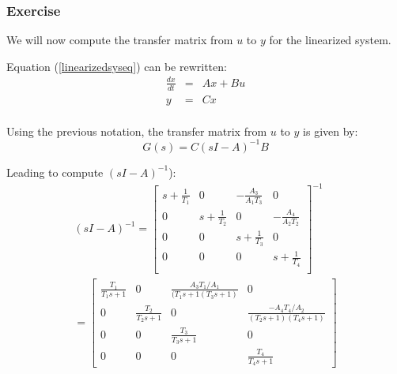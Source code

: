 \subsubsection{Exercise}

We will now compute the transfer matrix from $u$ to $y$ for the linearized system.

Equation (\ref{linearizedsyseq}) can be rewritten:
$$
\begin{array}{rcl}
    \frac{dx}{dt} & = & Ax + Bu \\
    y & = & Cx \\
\end{array}
$$ 

Using the previous notation, the transfer matrix from $u$ to $y$ is given by:
$$
G(s) = C(sI-A)^{-1}B
$$

Leading to compute $(sI-A)^{-1}$):
\begin{multline*}
    (sI-A)^{-1} = 
    \left[\begin{array}{cccc}
                s+\frac{1}{T_1} & 0 & -\frac{A_3}{A_1 T_3} & 0 \\
                0 & s+\frac{1}{T_2} & 0 & -\frac{A_4}{A_2 T_2} \\
                0 & 0 & s+\frac{1}{T_3} & 0 \\
                0 & 0 & 0 & s+\frac{1}{T_4} \\
    \end{array} \right]^{-1}
   \\ 
     =  
    \left[\begin{array}{cccc} 
            \frac{T_1}{T_1s + 1} & 0 & \frac{A_3T_1/A_1}{(T_1s + 1(T_3s + 1)} & 0\\
    0 & \frac{T_2}{T_2s + 1} & 0 & \frac{-A_4T_4/A_2}{(T_2s + 1)(T_4 s + 1)}\\ 
    0 & 0 & \frac{T_3}{T_3s + 1} & 0\\ 
    0 & 0 & 0 & \frac{T_4}{T_4s + 1} \end{array}\right]
\end{multline*}

